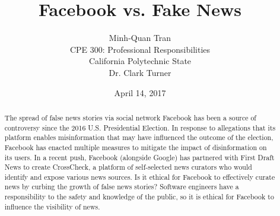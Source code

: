 


\title{\vfill Facebook vs. Fake News\\
\vspace{8pt}
\normalsize{}
}

\author{Minh-Quan Tran\\
\normalsize{CPE 300: Professional Responsibilities}\\
\normalsize{California Polytechnic State}\\
\normalsize{Dr. Clark Turner}
}

\date{April 14, 2017}

\maketitle


\vfill

\begin{abstract}
The spread of false news stories via social network Facebook has been a source of controversy since the 2016 U.S. Presidential Election. \cite{telegraph_fake_news} In response to allegations that its platform enables misinformation that may have influenced the outcome of the election, \cite{tc_snowden_fb} Facebook has enacted multiple measures to mitigate the impact of disinformation on its users. \cite{fb_reduce_clickbait,fb_addressing_hoaxes,fb_spot_fake_news} In a recent push, Facebook (alongside Google) has partnered with First Draft News to create CrossCheck, a platform of self-selected news curators who would identify and expose various news sources. \cite{crosscheck_launch} Is it ethical for Facebook to effectively curate news by curbing the growth of false news stories? Software engineers have a responsibility to the safety and knowledge of the public, \cite{se_code} so it is ethical for Facebook to influence the visibility of news.
\end{abstract}

\thispagestyle{empty} 
\pagebreak